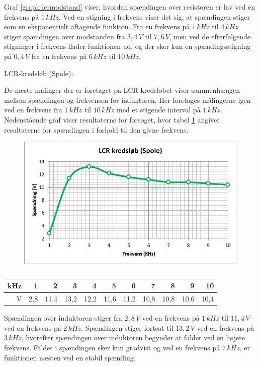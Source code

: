 Graf \ref{graph:lcrmodstand} viser, hvordan spændingen over resistoren er lav ved en frekvens på $1\, kHz$. Ved en stigning i frekvens viser det sig, at spændingen stiger som en eksponentielt aftagende funktion. Fra en frekvens på $1\, kHz$ til $4\, kHz$ stiger spændingen over modstanden fra $3,4\, V$ til $7,6\, V$, men ved de efterfølgende stigninger i frekvens flader funktionen ud, og der sker kun en spændingsstigning på $0,4\, V$ fra en frekvens på $6\, kHz$ til $10\, kHz$.

LCR-kredsløb (Spole):

De næste målinger der er foretaget på LCR-kredsløbet viser sammenhængen mellem spændingen og frekvensen for induktoren. Her foretages målingerne igen ved en frekvens fra $1\, kHz$ til $10\, kHz$ med et stigende interval på $1\, kHz$. Nedenstående graf viser resultaterne for forsøget, hvor tabel \ref{tabular:lcrspole} angiver resultaterne for spændingen i forhold til den givne frekvens.

\begin{figure}[H]
\includegraphics[scale=1]{Setup/Graf6}
\caption{}
\label{graph:lcrspole}
\end{figure}

\begin{table}[H]
\centering
\begin{tabular}{|r|r|r|r|r|r|r|r|r|r|r|} \hline
kHz & 1 & 2 & 3 & 4 & 5 & 6 & 7 & 8 & 9 & 10 \\ \hline
V & 2,8 & 11,4 & 13,2 & 12,2 & 11,6 & 11,2 & 10,8 & 10,8 & 10,6 & 10,4 \\ \hline
\end{tabular}
\caption{}
\label{tabular:lcrspole}
\end{table}

Spændingen over induktoren stiger fra $2,8\, V$ ved en frekvens på $1\, kHz$ til $11,4\, V$ ved en frekvens på $2\, kHz$. Spændingen stiger fortsat til $13,2\, V$ ved en frekvens på $3\, kHz$, hvorefter spændingen over induktoren begynder at falder ved en højere frekvens. Faldet i spændingen sker kun gradvist og ved en frekvens på $7\, kHz$, er funktionen næsten ved en stabil spænding.

